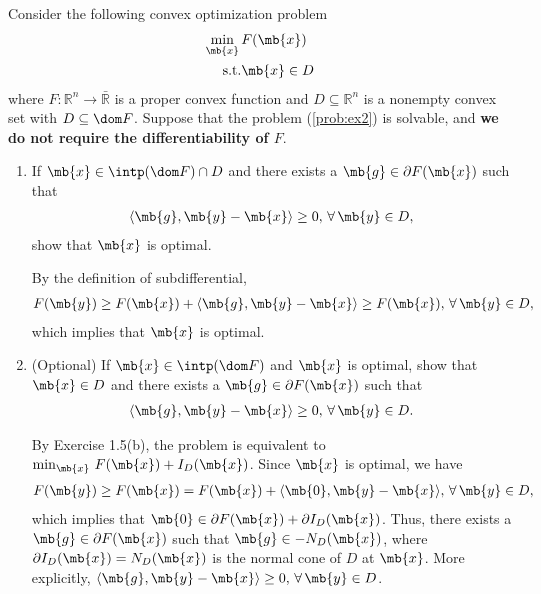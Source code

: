\begin{exercise}
    Consider the following convex optimization problem
    \begin{align}\label{prob:ex2}
        \min_\mb{x}\,        & F(\mb{x})   \\
        \nonumber\text{s.t.} & \mb{x}\in D
    \end{align}
    where $F:\mathbb{R}^n\rightarrow\bar{\mathbb{R}}$ is a proper convex function and $D\subseteq\mathbb{R}^n$
    is a nonempty convex set with $D\subseteq\dom F$. Suppose that the problem (\ref{prob:ex2}) is solvable, and {\bf we do not require the differentiability of $F$}.
    \begin{enumerate}
        \item If $\mb{x}\in\intp(\dom F) \cap D$ and there exists a $\mb{g}\in\partial F(\mb{x})$ such that
            \begin{align*}
                \langle \mb{g},\mb{y}-\mb{x} \rangle\ge 0,\, \forall\, \mb{y}\in D,
            \end{align*}
            show that $\mb{x}$ is optimal.

            \begin{solution}
                By the definition of subdifferential,
                \begin{align*}
                    F(\mb{y}) \ge F(\mb{x}) + \langle \mb{g},\mb{y}-\mb{x} \rangle \ge F(\mb{x}),\, \forall\, \mb{y}\in D,
                \end{align*}
                which implies that $\mb{x}$ is optimal.
            \end{solution}


        \item (Optional) If $\mb{x}\in\intp(\dom F)$ and $\mb{x}$ is optimal, show that $\mb{x}\in D$ and there exists a $\mb{g}\in\partial F(\mb{x})$ such that
            \begin{align*}
                \langle \mb{g},\mb{y}-\mb{x} \rangle\ge 0,\, \forall\, \mb{y}\in D.
            \end{align*}


            \begin{solution}
                By Exercise 1.5(b), the problem is equivalent to $\min_\mb{x}\, F(\mb{x}) + I_D(\mb{x})$. Since $\mb{x}$ is optimal, we have
                \begin{align*}
                    F(\mb{y}) \ge F(\mb{x}) = F(\mb{x}) + \langle \mb{0},\mb{y}-\mb{x} \rangle ,\, \forall\, \mb{y}\in D,
                \end{align*}
                which implies that $\mb{0}\in\partial F(\mb{x}) + \partial I_D(\mb{x})$. Thus, there exists a $\mb{g}\in\partial F(\mb{x})$ such that $\mb{g} \in -N_{D}(\mb{x})$, where $\partial I_D(\mb{x}) = N_{D}(\mb{x})$ is the normal cone of $D$ at $\mb{x}$. More explicitly, $\langle \mb{g},\mb{y}-\mb{x} \rangle\ge 0,\, \forall\, \mb{y}\in D$.
            \end{solution}



\end{enumerate}
\end{exercise}
